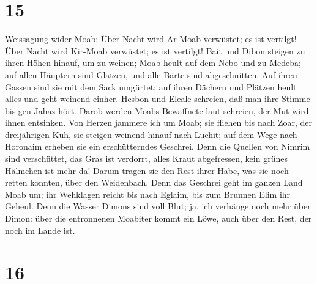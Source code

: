 \hypertarget{section-14}{%
\section{15}\label{section-14}}

 Weissagung wider Moab: Über Nacht wird Ar-Moab verwüstet;
es ist vertilgt! Über Nacht wird Kir-Moab verwüstet; es ist vertilgt!
 Bait und Dibon steigen zu ihren Höhen hinauf, um zu
weinen; Moab heult auf dem Nebo und zu Medeba; auf allen Häuptern sind
Glatzen, und alle Bärte sind abgeschnitten.  Auf ihren
Gassen sind sie mit dem Sack umgürtet; auf ihren Dächern und Plätzen
heult alles und geht weinend einher.  Hesbon und Eleale
schreien, daß man ihre Stimme bis gen Jahaz hört. Darob werden Moabs
Bewaffnete laut schreien, der Mut wird ihnen entsinken. 
Von Herzen jammere ich um Moab; sie fliehen bis nach Zoar, der
dreijährigen Kuh, sie steigen weinend hinauf nach Luchit; auf dem Wege
nach Horonaim erheben sie ein erschütterndes Geschrei. 
Denn die Quellen von Nimrim sind verschüttet, das Gras ist verdorrt,
alles Kraut abgefressen, kein grünes Hälmchen ist mehr da!
 Darum tragen sie den Rest ihrer Habe, was sie noch retten
konnten, über den Weidenbach.  Denn das Geschrei geht im
ganzen Land Moab um; ihr Wehklagen reicht bis nach Eglaim, bis zum
Brunnen Elim ihr Geheul.  Denn die Wasser Dimons sind voll
Blut; ja, ich verhänge noch mehr über Dimon: über die entronnenen
Moabiter kommt ein Löwe, auch über den Rest, der noch im Lande ist.

\hypertarget{section-15}{%
\section{16}\label{section-15}}

